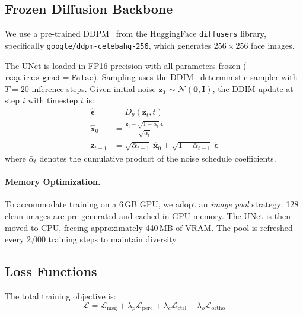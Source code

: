\documentclass[10pt, twocolumn]{article}
\newcommand{\Lcal}{\mathcal{L}}
\newcommand{\Ncal}{\mathcal{N}}
\begin{document}
\subsection{Frozen Diffusion Backbone}
\label{sec:diffusion}

We use a pre-trained DDPM~\cite{ho2020denoising} from the HuggingFace \texttt{diffusers} library, specifically \texttt{google/ddpm-celebahq-256}, which generates $256\times256$ face images.

The UNet is loaded in FP16 precision with all parameters frozen ($\texttt{requires\_grad\_ = False}$).
Sampling uses the DDIM~\cite{song2020denoising} deterministic sampler with $T = 20$ inference steps.
Given initial noise $\mathbf{z}_T \sim \Ncal(\mathbf{0}, \mathbf{I})$, the DDIM update at step $i$ with timestep $t$ is:
\begin{align}
    \hat{\bm{\epsilon}} &= D_\theta(\mathbf{z}_t, t) \label{eq:noise_pred} \\
    \hat{\mathbf{x}}_0 &= \frac{\mathbf{z}_t - \sqrt{1 - \bar{\alpha}_t}\, \hat{\bm{\epsilon}}}{\sqrt{\bar{\alpha}_t}} \label{eq:x0_pred} \\
    \mathbf{z}_{t-1} &= \sqrt{\bar{\alpha}_{t-1}}\, \hat{\mathbf{x}}_0 + \sqrt{1 - \bar{\alpha}_{t-1}}\, \hat{\bm{\epsilon}} \label{eq:ddim_step}
\end{align}
where $\bar{\alpha}_t$ denotes the cumulative product of the noise schedule coefficients.

\paragraph{Memory Optimization.}
To accommodate training on a 6\,GB GPU, we adopt an \emph{image pool} strategy: 128 clean images are pre-generated and cached in GPU memory.
The UNet is then moved to CPU, freeing approximately 440\,MB of VRAM.
The pool is refreshed every 2{,}000 training steps to maintain diversity.

\subsection{Loss Functions}
\label{sec:losses}

The total training objective is:
\begin{equation}
    \Lcal = \Lcal_\text{msg} + \lambda_p \Lcal_\text{perc} + \lambda_c \Lcal_\text{ctrl} + \lambda_o \Lcal_\text{ortho}
    \label{eq:total_loss}
\end{equation}
\end{document}
